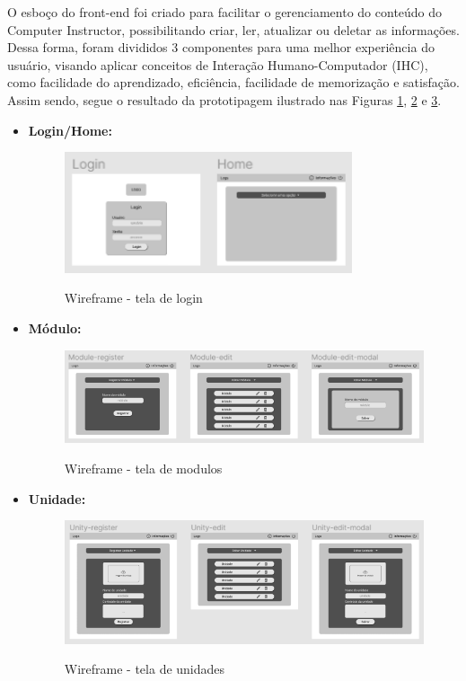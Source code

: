 O esboço do front-end foi criado para facilitar o gerenciamento do conteúdo do Computer Instructor, possibilitando criar, ler, atualizar ou deletar as informações. Dessa forma, foram divididos 3 componentes para uma melhor experiência do usuário, visando aplicar conceitos de Interação Humano-Computador (IHC), como facilidade do aprendizado, eficiência, facilidade de memorização e satisfação. Assim sendo, segue o resultado da prototipagem ilustrado nas Figuras \ref{fig:wireframe_login}, \ref{fig:wireframe_modulo} e \ref{fig:wireframe_unidade}.

\begin{itemize}
    \item \textbf{Login/Home:}

\begin{figure}[H]
    \centering
    \caption{Wireframe - tela de login}
    \includegraphics[width=0.8\textwidth]{figuras/Wireframe login-home.png}
    \label{fig:wireframe_login}
    {}
\end{figure}

\item \textbf{Módulo:}


\begin{figure}[H]
    \centering
    \caption{Wireframe - tela de modulos}
    \includegraphics[width=1\textwidth]{figuras/Wireframe modulo.png}
    \label{fig:wireframe_modulo}
    {}
\end{figure}

\item \textbf{Unidade:}


\begin{figure}[H]
    \centering
    \caption{Wireframe - tela de unidades}
    \includegraphics[width=1\textwidth]{figuras/Wireframe unidade.png}
    \label{fig:wireframe_unidade}
    {}
\end{figure}


\end{itemize}
